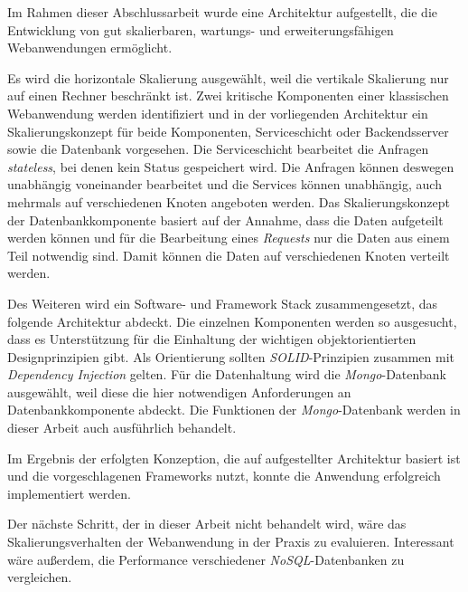 
Im Rahmen dieser Abschlussarbeit wurde eine Architektur aufgestellt, die die Entwicklung von gut skalierbaren, wartungs- und erweiterungsfähigen Webanwendungen ermöglicht.

Es wird die horizontale Skalierung ausgewählt, weil die vertikale Skalierung nur auf einen Rechner beschränkt ist. Zwei kritische Komponenten einer klassischen Webanwendung werden identifiziert und in der vorliegenden Architektur ein Skalierungskonzept für beide Komponenten, Serviceschicht oder Backendsserver sowie die Datenbank vorgesehen. Die Serviceschicht bearbeitet die Anfragen \textit{stateless}, bei denen kein Status gespeichert wird. Die Anfragen können deswegen unabhängig voneinander bearbeitet und die Services können unabhängig, auch mehrmals auf verschiedenen Knoten angeboten werden. Das Skalierungskonzept der Datenbankkomponente basiert auf der Annahme, dass die Daten aufgeteilt werden können und für die Bearbeitung eines \textit{Requests} nur die Daten aus einem Teil notwendig sind. Damit können die Daten auf verschiedenen Knoten verteilt werden.

Des Weiteren wird ein Software- und Framework Stack zusammengesetzt, das folgende Architektur abdeckt. Die einzelnen Komponenten werden so ausgesucht, dass es Unterstützung für die Einhaltung der wichtigen objektorientierten Designprinzipien gibt. Als Orientierung sollten \textit{SOLID}-Prinzipien zusammen mit \textit{Dependency Injection} gelten. Für die Datenhaltung wird die \textit{Mongo}-Datenbank ausgewählt, weil diese die hier notwendigen Anforderungen an Datenbankkomponente abdeckt. Die Funktionen der \textit{Mongo}-Datenbank werden in dieser Arbeit auch ausführlich behandelt. 

Im Ergebnis der erfolgten Konzeption, die auf aufgestellter Architektur basiert ist und die vorgeschlagenen Frameworks nutzt, konnte die Anwendung erfolgreich implementiert werden.

Der nächste Schritt, der in dieser Arbeit nicht behandelt wird, wäre das Skalierungsverhalten der Webanwendung in der Praxis zu evaluieren. Interessant wäre außerdem, die Performance verschiedener \textit{NoSQL}-Datenbanken zu vergleichen. 

